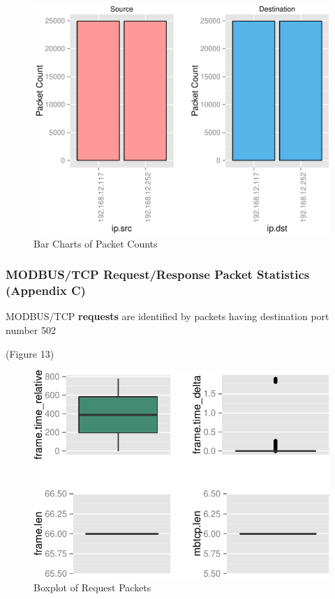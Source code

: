 \documentclass[11pt,]{article}
\begin{document}
\begin{figure}

{\centering \includegraphics{thesis_files/figure-latex/unnamed-chunk-20-1} 

}

\caption{Bar Charts of Packet Counts}\label{fig:unnamed-chunk-20}
\end{figure}

\clearpage

\subsubsection{MODBUS/TCP Request/Response Packet Statistics (Appendix
C)}\label{modbustcp-requestresponse-packet-statistics-appendix-c}

MODBUS/TCP \textbf{requests} are identified by packets having
destination port number 502

(Figure 13)

\begin{figure}

{\centering \includegraphics{thesis_files/figure-latex/unnamed-chunk-22-1} 

}

\caption{Boxplot of Request Packets}\label{fig:unnamed-chunk-22}
\end{figure}
\end{document}
